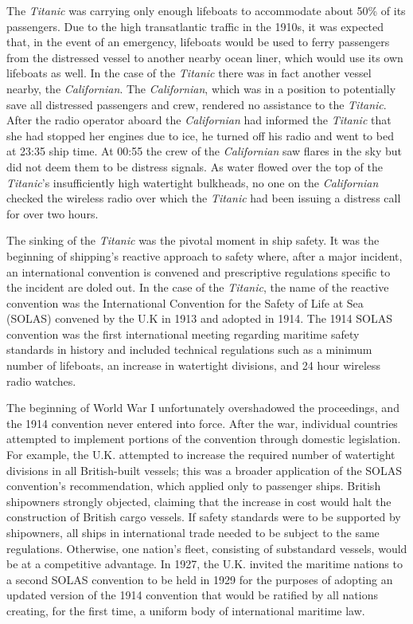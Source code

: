 \documentclass[twoside,symmetric,notoc]{tufte-book}
\begin{document}
\par{%
The \textit{Titanic} was carrying only enough lifeboats to accommodate about 50\% of its passengers.\cite{Peltz} Due to the high transatlantic traffic in the 1910s, it was expected that, in the event of an emergency, lifeboats would be used to ferry passengers from the distressed vessel to another nearby ocean liner, which would use its own lifeboats as well.\cite{Cox} In the case of the \textit{Titanic} there was in fact another vessel nearby, the \textit{Californian}. The \textit{Californian}, which was in a position to potentially save all distressed passengers and crew, rendered no assistance to the \textit{Titanic}. After the radio operator aboard the \textit{Californian} had informed the \textit{Titanic} that she had stopped her engines due to ice, he turned off his radio and went to bed at 23:35 ship time. At 00:55 the crew of the \textit{Californian} saw flares in the sky but did not deem them to be distress signals. As water flowed over the top of the \textit{Titanic}'s insufficiently high watertight bulkheads, no one on the \textit{Californian} checked the wireless radio over which the \textit{Titanic} had been issuing a distress call for over two hours.\cite{Flayhart}
}
\par{%
The sinking of the \textit{Titanic} was the pivotal moment in ship safety. It was the beginning of shipping's reactive approach to safety where, after a major incident, an international convention is convened and prescriptive regulations specific to the incident are doled out.\cite{Haapasaari} In the case of the \textit{Titanic}, the name of the reactive convention was the International Convention for the Safety of Life at Sea (SOLAS) convened by the U.K in 1913 and adopted in 1914.\cite{Phillips} The 1914 SOLAS convention was the first international meeting regarding maritime safety standards in history and included technical regulations such as a minimum number of lifeboats, an increase in watertight divisions, and 24 hour wireless radio watches.
}
\par{%
The beginning of World War I unfortunately overshadowed the proceedings, and the 1914 convention never entered into force. After the war, individual countries attempted to implement portions of the convention through domestic legislation. For example, the U.K. attempted to increase the required number of watertight divisions in all British-built vessels; this was a broader application of the SOLAS convention's recommendation, which applied only to passenger ships. British shipowners strongly objected, claiming that the increase in cost would halt the construction of British cargo vessels. If safety standards were to be supported by shipowners, all ships in international trade needed to be subject to the same regulations. Otherwise, one nation's fleet, consisting of substandard vessels, would be at a competitive advantage. In 1927, the U.K. invited the maritime nations to a second SOLAS convention to be held in 1929 for the purposes of adopting an updated version of the 1914 convention that would be ratified by all nations creating, for the first time, a uniform body of international maritime law.\cite{Rock}
}
\end{document}
